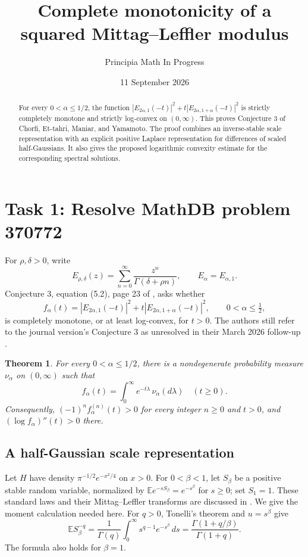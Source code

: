 \documentclass[11pt]{article}
\title{Complete monotonicity of a squared Mittag--Leffler modulus}
\author{Principia Math In Progress}
\date{11 September 2026}
\newtheorem{theorem}{Theorem}
\newcommand{\E}{\mathbb E}
\begin{document}
\maketitle
\begin{abstract}
For every $0<\alpha\leq1/2$, the function
$|E_{2\alpha,1}(-t)|^2+t|E_{2\alpha,1+\alpha}(-t)|^2$
is strictly completely monotone and strictly log-convex on $(0,\infty)$.
This proves Conjecture 3 of Chorfi, Et-tahri, Maniar, and Yamamoto.
The proof combines an inverse-stable scale representation with an explicit
positive Laplace representation for differences of scaled half-Gaussians.
It also gives the proposed logarithmic convexity estimate for the
corresponding spectral solutions.
\end{abstract}

\section*{Task 1: Resolve MathDB problem 370772}
For $\rho,\delta>0$, write
\[
 E_{\rho,\delta}(z)=\sum_{n=0}^\infty\frac{z^n}{\Gamma(\delta+\rho n)},
 \qquad E_\alpha=E_{\alpha,1}.
\]
Conjecture 3, equation (5.2), page 23 of \cite{source}, asks whether
\begin{equation}\label{eq:target}
 f_\alpha(t)=|E_{2\alpha,1}(-t)|^2
       +t|E_{2\alpha,1+\alpha}(-t)|^2,
 \qquad 0<\alpha\leq\tfrac12,
\end{equation}
is completely monotone, or at least log-convex, for $t>0$.
The authors still refer to the journal version's Conjecture 3 as unresolved
in their March 2026 follow-up \cite[page 13]{followup}.

\begin{theorem}\label{thm:main}
For every $0<\alpha\leq1/2$, there is a nondegenerate probability measure
$\nu_\alpha$ on $(0,\infty)$ such that
\begin{equation}\label{eq:laplace}
 f_\alpha(t)=\int_0^\infty e^{-t\lambda}\,\nu_\alpha(d\lambda)
 \quad(t\geq0).
\end{equation}
Consequently, $(-1)^n f_\alpha^{(n)}(t)>0$ for every integer $n\geq0$
and $t>0$, and $(\log f_\alpha)''(t)>0$ there.
\end{theorem}

\subsection*{A half-Gaussian scale representation}
Let $H$ have density $\pi^{-1/2}e^{-x^2/4}$ on $x>0$.
For $0<\beta<1$, let $S_\beta$ be a positive stable random variable,
normalized by $\E e^{-sS_\beta}=e^{-s^\beta}$ for $s\geq0$;
set $S_1=1$.
These standard laws and their Mittag--Leffler transforms are discussed in
\cite[Examples 3.10--3.11]{janson}. We give the moment calculation needed here.
For $q>0$, Tonelli's theorem and $u=s^\beta$ give
\begin{equation}\label{eq:negative-moment}
 \E S_\beta^{-q}
 =\frac1{\Gamma(q)}\int_0^\infty s^{q-1}e^{-s^\beta}\,ds
 =\frac{\Gamma(1+q/\beta)}{\Gamma(1+q)}.
\end{equation}
The formula also holds for $\beta=1$.
\end{document}
